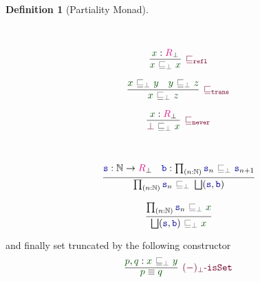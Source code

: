 \documentclass[twoside,11pt,openright]{report}
\theoremstyle{plain} %
\theoremstyle{definition}
\newtheorem{defn}[thm]{Definition}%
\theoremstyle{remark}
\newcommand*{\term}[1]{\textcolor{green!30!black}{#1}} %
\newcommand*{\type}[1]{\textcolor{magenta!90!black}{#1}}
\newcommand*{\relation}[1]{\textcolor{gray!75!black}{\ensuremath{\mathtt{#1}}}}
\newcommand*{\function}[1]{\textcolor{blue!60!black}{\ensuremath{\mathtt{#1}}}}
\newcommand*{\constructor}[1]{\textcolor{purple!60!black}{\ensuremath{\mathtt{#1}}}}
\begin{document}
\begin{defn}[Partiality Monad]
\begin{center}
\begin{minipage}{0.45\linewidth}
    \end{minipage}
  \end{center}
  \strut\\[-15mm]
  \begin{center}
    \begin{minipage}{0.25\linewidth}
      \begin{equation}
        \vcenter{\infer[\constructor{\sqsubseteq_{refl}}]{\term{x}~\relation{\sqsubseteq_{\bot}}~\term{x}}{\term{x} : \type{R}_\bot}}
      \end{equation}
    \end{minipage}
    \hfill
    \begin{minipage}{0.35\linewidth}
      \begin{equation}
        \vcenter{\infer[\constructor{\sqsubseteq_{trans}}]{\term{x}~\relation{\sqsubseteq_{\bot}}~\term{z}}{\term{x}~\relation{\sqsubseteq_{\bot}}~\term{y} & \term{y}~\relation{\sqsubseteq_{\bot}}~\term{z}}}
      \end{equation}
    \end{minipage}
    \hfill
    \begin{minipage}{0.25\linewidth}
      \begin{equation}
        \vcenter{\infer[\constructor{\sqsubseteq_{never}}]{\constructor{\bot}~\relation{\sqsubseteq_{\bot}}~\term{x}}{\term{x} : \type{R}_\bot}}
      \end{equation}
    \end{minipage}
  \end{center}
  \strut\\[-15mm]
  \begin{center}
    \hfill
    \begin{minipage}{0.50\linewidth}
      \begin{equation}
        \vcenter{\infer{\prod_{(n : \mathbb{N})} \function{s}_n~\relation{\sqsubseteq_{\bot}}~\bigsqcup(\function{s},\function{b})}{\function{s} : \mathbb{N} \rightarrow \type{R}_\bot & \function{b} : \prod_{(n : \mathbb{N})} \function{s}_n~\relation{\sqsubseteq_{\bot}}~\function{s}_{n+1} }}
      \end{equation}
    \end{minipage}
    \hfill
    \begin{minipage}{0.3\linewidth}
      \begin{equation}
        \vcenter{\infer{\bigsqcup(\function{s},\function{b})~\relation{\sqsubseteq_{\bot}}~\term{x}}{\prod_{(n:\mathbb{N})} \function{s}_n~\relation{\sqsubseteq_{\bot}}~\term{x}}}
      \end{equation}
    \end{minipage}
  \end{center}
  and finally set truncated by the following constructor
  \begin{equation}
    \vcenter{\infer[\constructor{(-)_\bot\text{-}isSet}]{\term{p} \equiv \term{q}}{\term{p} , \term{q} : \term{x}~\relation{\sqsubseteq_{\bot}}~\term{y}}}
  \end{equation}
\end{defn}
\end{document}
